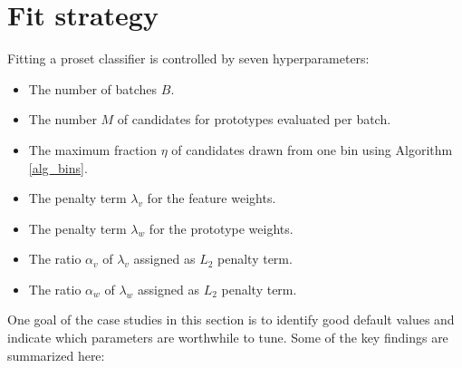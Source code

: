 \section{Fit strategy}
\label{sec_classifier_fit}
%
Fitting a proset classifier is controlled by seven hyperparameters:
%
\begin{itemize}
\item The number of batches $B$.
%
\item The number $M$ of candidates for prototypes evaluated per batch.
%
\item The maximum fraction $\eta$ of candidates drawn from one bin using Algorithm \ref{alg_bins}.
%
\item The penalty term $\lambda_v$ for the feature weights.
%
\item The penalty term $\lambda_w$ for the prototype weights.
%
\item The ratio $\alpha_v$ of $\lambda_v$ assigned as $L_2$ penalty term.
%
\item The ratio $\alpha_w$ of $\lambda_w$ assigned as $L_2$ penalty term.
\end{itemize}
%
One goal of the case studies in this section is to identify good default values and indicate which parameters are worthwhile to tune.
Some of the key findings are summarized here:
%
